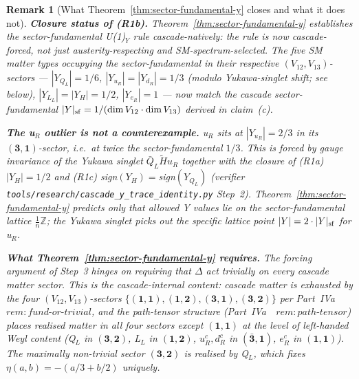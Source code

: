 \documentclass[12pt,a4paper]{article}
\newtheorem*{remark}{Remark}
\begin{document}
\begin{remark}[What Theorem~\ref{thm:sector-fundamental-y} closes and what it does not]\label{rem:sector-fundamental-status}
\textbf{Closure status of (R1b).}
Theorem~\ref{thm:sector-fundamental-y} establishes the sector-fundamental U(1)$_Y$ rule cascade-natively: the rule is now \emph{cascade-forced}, not just austerity-respecting and SM-spectrum-selected. The five SM matter types occupying the sector-fundamental in their respective $(V_{12},V_{13})$-sectors --- $|Y_{Q_L}|=1/6$, $|Y_{u_R}|=|Y_{d_R}|=1/3$ (modulo Yukawa-singlet shift; see below), $|Y_{L_L}|=|Y_H|=1/2$, $|Y_{e_R}|=1$ --- now match the cascade sector-fundamental $|Y|_{\rm sf}=1/(\dim V_{12}\cdot\dim V_{13})$ derived in claim~(c).

\textbf{The u$_R$ outlier is not a counterexample.} u$_R$ sits at $|Y_{u_R}|=2/3$ in its $(\mathbf{3},\mathbf{1})$-sector, i.e.\ at \emph{twice} the sector-fundamental $1/3$. This is forced by gauge invariance of the Yukawa singlet $\bar Q_L\widetilde H u_R$ together with the closure of (R1a) $|Y_H|=1/2$ and (R1c) sign$(Y_H)=$sign$(Y_{Q_L})$ (verifier \texttt{tools/research/cascade\_y\_trace\_identity.py} Step~2). Theorem~\ref{thm:sector-fundamental-y} predicts only that allowed Y values lie on the sector-fundamental lattice $\frac{1}{n}\mathbb{Z}$; the Yukawa singlet picks out the specific lattice point $|Y|=2\cdot|Y|_{\rm sf}$ for u$_R$.

\textbf{What Theorem~\ref{thm:sector-fundamental-y} requires.} The forcing argument of Step~3 hinges on requiring that $\Delta$ act trivially on \emph{every} cascade matter sector. This is the cascade-internal content: cascade matter is exhausted by the four $(V_{12},V_{13})$-sectors $\{(\mathbf{1},\mathbf{1}),(\mathbf{1},\mathbf{2}),(\mathbf{3},\mathbf{1}),(\mathbf{3},\mathbf{2})\}$ per Part~IVa~\cite{part4a}~$\mathit{rem{:}fund\text{-}or\text{-}trivial}$, and the path-tensor structure (Part~IVa~\cite{part4a}~$\mathit{rem{:}path\text{-}tensor}$) places \emph{realised} matter in all four sectors except $(\mathbf{1},\mathbf{1})$ at the level of left-handed Weyl content (Q$_L$ in $(\mathbf{3},\mathbf{2})$, L$_L$ in $(\mathbf{1},\mathbf{2})$, $u_R^c,d_R^c$ in $(\bar{\mathbf{3}},\mathbf{1})$, $e_R^c$ in $(\mathbf{1},\mathbf{1})$). The maximally non-trivial sector $(\mathbf{3},\mathbf{2})$ is realised by Q$_L$, which fixes $\eta(a,b)=-(a/3+b/2)$ uniquely.


\end{remark}
\end{document}
